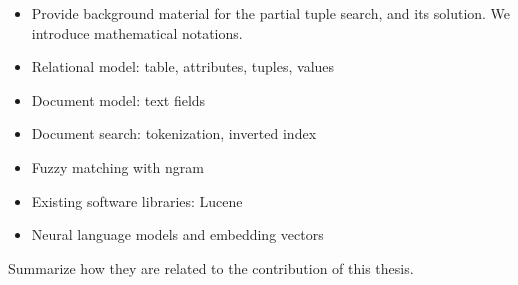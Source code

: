 \begin{itemize}
    \item Provide background material for the partial tuple search, and its solution.  We introduce mathematical notations.
    \item Relational model: table, attributes, tuples, values
    \item Document model: text fields
    \item Document search: tokenization, inverted index
    \item Fuzzy matching with ngram
    \item Existing software libraries: Lucene
    \item Neural language models and embedding vectors
\end{itemize}

Summarize how they are related to the contribution of this thesis.